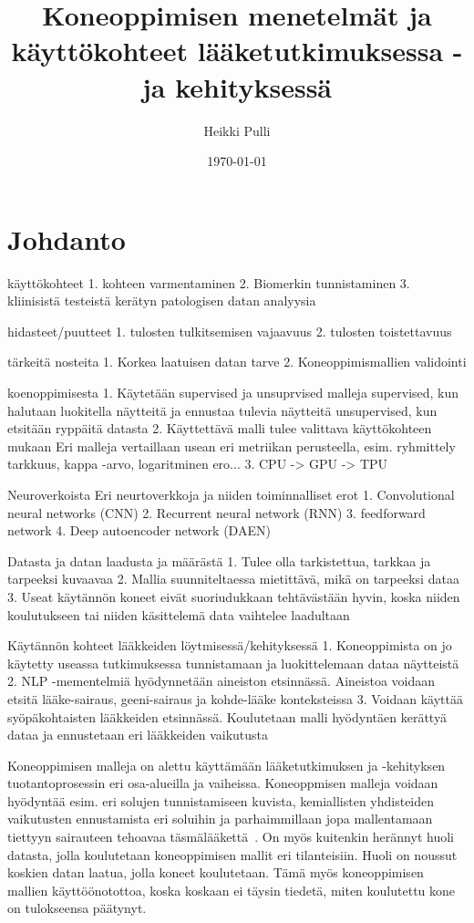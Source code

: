 \documentclass[finnish,twoside,censored,essay,sw-line]{HYthesisML}
\title{Koneoppimisen menetelmät ja käyttökohteet lääketutkimuksessa -ja kehityksessä}
\author{Heikki Pulli}
\date{\today}
\begin{document}
\maketitle

\mytableofcontents
\mainmatter

\chapter{Johdanto}

käyttökohteet
1.  kohteen varmentaminen
2.  Biomerkin tunnistaminen
3.  kliinisistä testeistä kerätyn patologisen datan analyysia

hidasteet/puutteet
1.  tulosten tulkitsemisen vajaavuus
2.  tulosten toistettavuus

tärkeitä nosteita
1.  Korkea laatuisen datan tarve
2.  Koneoppimismallien validointi

koenoppimisesta
1.  Käytetään supervised ja unsuprvised malleja
supervised, kun halutaan luokitella näytteitä ja ennustaa tulevia näytteitä
unsupervised, kun etsitään ryppäitä datasta
2.  Käyttettävä malli tulee valittava käyttökohteen mukaan
Eri malleja vertaillaan usean eri metriikan perusteella, esim. ryhmittely tarkkuus, kappa -arvo,
logaritminen ero...
3. CPU -> GPU -> TPU

Neuroverkoista
Eri neurtoverkkoja ja niiden toiminnalliset erot
1.  Convolutional neural networks (CNN)
2.  Recurrent neural network (RNN)
3.  feedforward network
4.  Deep autoencoder network (DAEN)

Datasta ja datan laadusta ja määrästä
1.  Tulee olla tarkistettua, tarkkaa ja tarpeeksi kuvaavaa
2.  Mallia suunniteltaessa mietittävä, mikä on tarpeeksi dataa
3.  Useat käytännön koneet eivät suoriudukkaan tehtävästään hyvin, koska
niiden koulutukseen tai niiden käsittelemä data vaihtelee laadultaan

Käytännön kohteet lääkkeiden löytmisessä/kehityksessä
1.  Koneoppimista on jo käytetty useassa tutkimuksessa tunnistamaan ja luokittelemaan
dataa näytteistä
2.  NLP -mementelmiä hyödynnetään aineiston etsinnässä. Aineistoa voidaan etsitä
lääke-sairaus, geeni-sairaus ja kohde-lääke konteksteissa
3.  Voidaan käyttää syöpäkohtaisten lääkkeiden etsinnässä. Koulutetaan malli hyödyntäen
kerättyä dataa ja ennustetaan eri lääkkeiden vaikutusta


Koneoppimisen malleja on alettu käyttämään lääketutkimuksen ja -kehityksen tuotantoprosessin eri osa-alueilla ja vaiheissa. Koneoppmisen malleja voidaan hyödyntää esim. eri
solujen tunnistamiseen kuvista, kemiallisten yhdisteiden vaikutusten ennustamista eri soluihin ja parhaimmillaan jopa mallentamaan tiettyyn sairauteen tehoavaa täsmälääkettä~\cite{vamathevan}.
On myös kuitenkin herännyt huoli datasta, jolla koulutetaan koneoppimisen mallit eri tilanteisiin. Huoli on noussut koskien datan laatua, jolla koneet koulutetaan. Tämä myös
koneoppimisen mallien käyttöönotottoa, koska koskaan ei täysin tiedetä, miten koulutettu kone on tulokseensa päätynyt.
\end{document}
